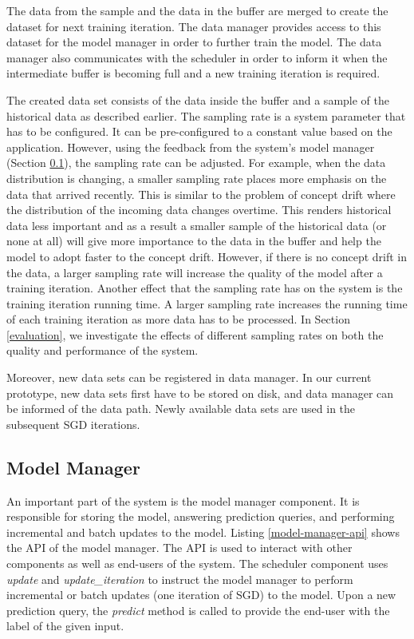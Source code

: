 \documentclass{vldb}
\begin{document}
The data from the sample and the data in the buffer are merged to create the dataset for next training iteration.
The data manager provides access to this dataset for the model manager in order to further train the model.
The data manager also communicates with the scheduler in order to inform it when the intermediate buffer is becoming full and a new training iteration is required. 

The created data set consists of the data inside the buffer and a sample of the historical data as described earlier.
The sampling rate is a system parameter that has to be configured.
It can be pre-configured to a constant value based on the application.
However, using the feedback from the system's model manager (Section \ref{model-manager}), the sampling rate can be adjusted.
For example, when the data distribution is changing, a smaller sampling rate places more emphasis on the data that arrived recently. 
This is similar to the problem of concept drift where the distribution of the incoming data changes overtime.
This renders historical data less important and as a result a smaller sample of the historical data (or none at all) will give more importance to the data in the buffer and help the model to adopt faster to the concept drift.
However, if there is no concept drift in the data, a larger sampling rate will increase the quality of the model after a training iteration.
Another effect that the sampling rate has on the system is the training iteration running time.
A larger sampling rate increases the running time of each training iteration as more data has to be processed.
In Section \ref{evaluation}, we investigate the effects of different sampling rates on both the quality and performance of the system.

Moreover,  new data sets can be registered in data manager.
In our current prototype, new data sets first have to be stored on disk, and data manager can be informed of the data path.
Newly available data sets are used in the subsequent SGD iterations.

\subsection{Model Manager} \label{model-manager} 
An important part of the system is the model manager component.
It is responsible for storing the model, answering prediction queries, and performing incremental and batch updates to the model.
Listing \ref{model-manager-api} shows the API of the model manager.
The API is used to interact with other components as well as end-users of the system.
The scheduler component uses \textit{update} and \textit{update\_iteration} to instruct the model manager to perform incremental or batch updates (one iteration of SGD) to the model.
Upon a new prediction query, the \textit{predict} method is called to provide the end-user with the label of the given input.
\end{document}
